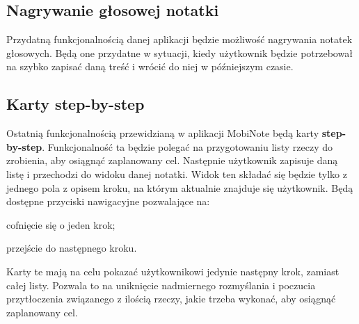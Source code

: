 \subsection{Nagrywanie głosowej notatki}

Przydatną funkcjonalnością danej aplikacji będzie możliwość nagrywania notatek głosowych. Będą one przydatne w sytuacji, kiedy użytkownik będzie potrzebował na szybko zapisać daną treść i wrócić do niej w późniejszym czasie.

\subsection{Karty step-by-step}

Ostatnią funkcjonalnością przewidzianą w aplikacji MobiNote będą karty \textbf{step-by-step}.
Funkcjonalność ta będzie polegać na przygotowaniu listy rzeczy do zrobienia, aby osiągnąć zaplanowany cel. Następnie użytkownik zapisuje daną listę i przechodzi do widoku danej notatki. Widok ten składać się będzie tylko z jednego pola z opisem kroku, na którym aktualnie znajduje się użytkownik. Będą dostępne przyciski nawigacyjne pozwalające na:
\begin{compactitem}
    \item cofnięcie się o jeden krok;
    \item przejście do następnego kroku.
    
\end{compactitem}

Karty te mają na celu pokazać użytkownikowi jedynie następny krok, zamiast całej listy. Pozwala to na uniknięcie nadmiernego rozmyślania i poczucia przytłoczenia związanego z ilością rzeczy, jakie trzeba wykonać, aby osiągnąć zaplanowany cel.